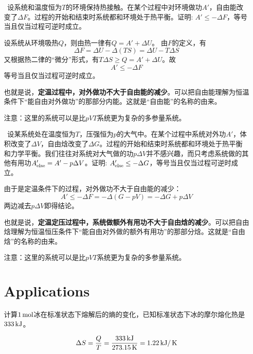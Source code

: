 \documentclass[CJK]{beamer}
\begin{document}
\begin{frame}
\bch
{\small
{\blue  设系统和温度恒为$T$的环境保持热接触。在某个过程中对环境做功$A'$，自由能改变了$\Delta F$。过程的开始和结束时系统都和环境处于热平衡。证明: $A'\le -\Delta F$，等号当且仅当过程可逆时成立。}

设系统从环境吸热$Q$，则由热一律有$Q = A' + \Delta U$。
由$F$的定义，有
$$\Delta F = \Delta U - \Delta (TS) = \Delta U - T\Delta S $$
又根据热二律的“微分”形式，有$T\Delta S \ge Q = A' +\Delta U$。故
$$A' \le - \Delta F$$
等号当且仅当过程可逆时成立。

也就是说，{\bf 定温过程中，对外做功不大于自由能的减少}。可以把自由能理解为恒温条件下“能自由对外做功”的那部分内能。这就是“自由能”的名称的由来。
}

{\scriptsize
注意：这里的系统可以是比$pVT$系统更为复杂的多参量系统。
}
\ech
\end{frame}

\begin{frame}
\bch

{\blue  设某系统处在温度恒为$T$，压强恒为$p$的大气中。在某个过程中系统对外功$A'$，体积改变了$\Delta V$，自由焓改变了$\Delta G$。过程的开始和结束时系统都和环境处于热平衡和力学平衡。我们往往对系统对大气做的功$p\Delta V$并不感兴趣，而只考虑系统做的其他有用功$A'_{\rm else} = A'-p\Delta V$。证明: $A'_{\rm else}  \le -\Delta G$，等号当且仅当过程可逆时成立。}

由于是定温条件下的过程，对外做功不大于自由能的减少：
$$ A' \le - \Delta F = -\Delta (G- pV) = - \Delta G + p \Delta V$$
两边减去$p\Delta V$即得结论。

也就是说，{\bf 定温定压过程中，系统做额外有用功不大于自由焓的减少}。可以把自由焓理解为恒温恒压条件下“能自由对外做的额外有用功”的那部分焓。这就是“自由焓”的名称的由来。

{\scriptsize
注意：这里的系统可以是比$pVT$系统更为复杂的多参量系统。
}
\ech
\end{frame}

\section{Applications}

\begin{frame}
\bch
{计算$1\,\mathrm{mol}$冰在标准状态下熔解后的熵的变化，已知标准状态下冰的摩尔熔化热是$333\,\mathrm{kJ}$。}

\skipline
{
$$\Delta S = \frac{Q}{T} = \frac{333 \,\mathrm{kJ}}{273.15\,\mathrm{K}} = 1.22 \,\mathrm{kJ}/\,\mathrm{K} $$
}
\ech
\end{frame}
\end{document}
